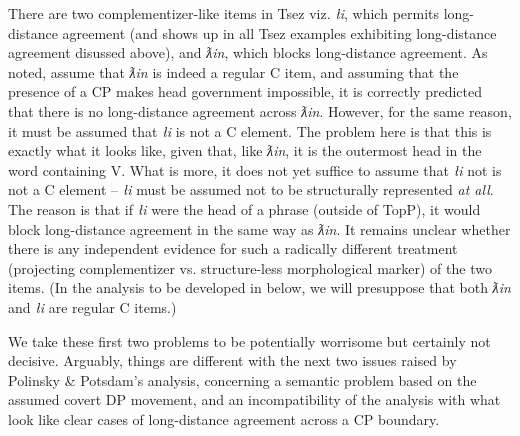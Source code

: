 \documentclass[output=paper
,modfonts
,nonflat]{langsci/langscibook}
\begin{document}
	
There are two comp\-lement\-izer-like items in Tsez viz. {\itshape {\l}i},
	which permits long-distance agreement (and shows up in all Tsez
	examples exhibiting long-distance agreement disussed above), and {\it
		ƛin}, which blocks long-distance agreement. As noted,
	\citet{PolinskyPotsdam:01} assume that {\itshape ƛin} is
	indeed a regular C item, and assuming that the presence of a CP makes
	head government impossible, it is correctly predicted that there is no
	long-distance agreement across {\itshape ƛin}.
	However,  for the same reason, it must be assumed that {\itshape {\l}i} is
	not a C element. The problem here is that this is exactly what
	it looks like, given that, like {\itshape ƛin}, it is the
	outermost head in the word containing V. What is more, it does not yet suffice to
	assume that  {\itshape {\l}i} not is not a C element -- {\itshape {\l}i} must  be
	assumed not to be structurally represented {\itshape at all}. The reason is
	that if {\itshape {\l}i} were the head of a phrase (outside of TopP), it would block
	long-distance agreement in the same way as {\itshape ƛin}. 
	It remains unclear whether there is any independent evidence for such
	a radically different treatment (projecting complementizer
	vs. structure-less morphological marker) of the two items. (In the
	analysis to be developed in  below, we will presuppose that
	both  {\itshape ƛin} and {\itshape {\l}i} are regular C items.)
	
	We take these first two problems to be potentially worrisome but
	certainly not decisive. Arguably, things are different with the next
	two issues raised by Polinsky \& Potsdam's analysis, concerning a
	semantic problem based on the assumed covert DP movement, and an
	incompatibility of the analysis with what look like clear cases of
	long-distance agreement across a CP boundary.
	
	
	
\end{document}
